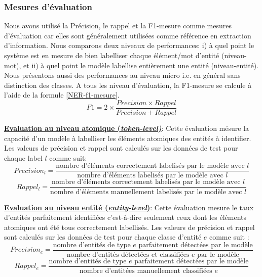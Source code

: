 \subsubsection{Mesures d'évaluation}
Nous avons utilisé la Précision, le rappel et la F1-mesure comme mesures d'évaluation car elles sont généralement utilisées comme référence en extraction d'information. Nous comparons deux niveaux de performances: i) à quel point le système est en mesure de bien labelliser chaque élément/mot d'entité (niveau-mot), et ii) à quel point le modèle labellise entièrement une entité (niveau-entité). Nous présentons aussi des performances au niveau micro i.e. en général sans distinction des classes. A tous les niveau d'évaluation, la F1-mesure se calcule à l'aide de la formule \ref{NER-f1-mesure}.  
\begin{equation}\label{NER-f1-mesure}
F1 = 2 \times \frac{Precision \times Rappel} {Precision + Rappel}
\end{equation}

\vspace{0.3cm}

\noindent \underline{\textbf{Evaluation au niveau atomique (\textit{token-level)}}}: Cette évaluation mésure la capacité d'un modèle à labelliser les éléments atomiques des entités à identifier. Les valeurs de précision et rappel sont calculés sur les données de test pour chaque label $l$ comme suit:
\[Precision_l = \frac{\text{nombre d'éléments correctement labelisés par le modèle avec } l} {\text{nombre d'éléments labelisés par le modèle avec } l}\]
\[Rappel_l = \frac{\text{nombre d'éléments correctement labelisés par le modèle avec } l} {\text{nombre d'éléments manuellement labelisés par le modèle avec } l}\]

\vspace{0.3cm}

\noindent \underline{\textbf{Evaluation au niveau entité (\textit{entity-level})}}: Cette évaluation mesure le taux d'entités parfaitement identifiées c'est-à-dire seulement ceux dont les éléments atomiques ont été tous correctement labellisés. Les valeurs de précision et rappel sont calculés sur les données de test pour chaque classe d'entité $e$ comme suit :
\[Precision_e = \frac{\text{nombre d'entités de type } e \text{ parfaitement détectées par le modèle}} {\text{nombre d'entités détectées et classifiées } e\text{ par le modèle}}\]
\[Rappel_e = \frac{\text{nombre d'entités de type } e \text{ parfaitement détectées par le modèle}} {\text{nombre d'entitées manuellement classifiées } e}\]

